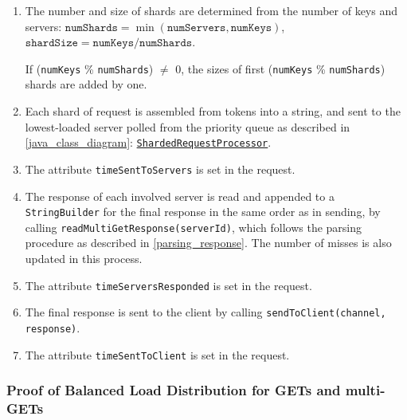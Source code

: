 \begin{enumerate}[noitemsep,topsep=0pt]
\item The number and size of shards are determined from the number of keys and servers: $ \texttt{numShards} = \min{(\texttt{numServers}, \texttt{numKeys})} $, $ \texttt{shardSize} = \texttt{numKeys} / \texttt{numShards} $. 

If (\texttt{numKeys} \% \texttt{numShards}) $\neq$ 0,  the sizes of first (\texttt{numKeys} \% \texttt{numShards}) shards are added by one.

\item Each shard of request is assembled from tokens into a string, and sent to the lowest-loaded server polled from the priority queue as described in \ref{java_class_diagram}: \hyperref[ShardedRequestProcessor]{\texttt{ShardedRequestProcessor}}.
\item The attribute \texttt{timeSentToServers} is set in the request.
\item The response of each involved server is read and appended to a \texttt{StringBuilder} for the final response in the same order as in sending, by calling \texttt{readMultiGetResponse(serverId)}, which follows the parsing procedure as described in \ref{parsing_response}. The number of misses is also updated in this process.
\item The attribute \texttt{timeServersResponded} is set in the request.
\item The final response is sent to the client by calling \texttt{sendToClient(channel, response)}.
\item The attribute \texttt{timeSentToClient} is set in the request.
\end{enumerate}

\subsubsection{Proof of Balanced Load Distribution for GETs and multi-GETs} \label{balance_proof}



